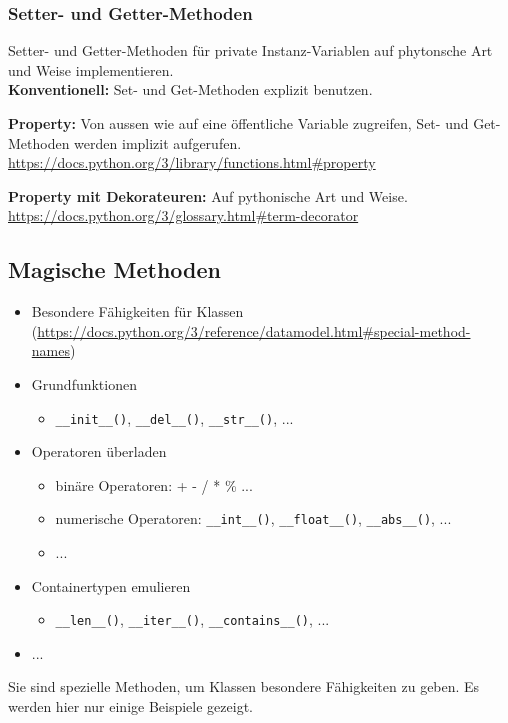 \subsubsection{Setter- und Getter-Methoden}
Setter- und Getter-Methoden für private Instanz-Variablen auf phytonsche Art und Weise implementieren.\\
\textbf{Konventionell:} Set- und Get-Methoden explizit benutzen.

\textbf{Property:} Von aussen wie auf eine öffentliche Variable zugreifen, Set- und Get-Methoden werden implizit aufgerufen.\\
\url{https://docs.python.org/3/library/functions.html#property}

\textbf{Property mit Dekorateuren:} Auf pythonische Art und Weise.\\
\url{https://docs.python.org/3/glossary.html#term-decorator}


\subsection{Magische Methoden}
\begin{itemize}
	\item Besondere Fähigkeiten für Klassen\\ (\url{https://docs.python.org/3/reference/datamodel.html#special-method-names})
	\item Grundfunktionen
	\begin{itemize}
		\item \texttt{\_\_init\_\_()}, \texttt{\_\_del\_\_()}, \texttt{\_\_str\_\_()}, ...
	\end{itemize}
	\item Operatoren überladen
	\begin{itemize}
		\item binäre Operatoren: + - / * \% ...
		\item numerische Operatoren: \texttt{\_\_int\_\_()}, \texttt{\_\_float\_\_()}, \texttt{\_\_abs\_\_()}, ...
		\item ...
	\end{itemize}
	\item Containertypen emulieren
	\begin{itemize}
		\item \texttt{\_\_len\_\_()}, \texttt{\_\_iter\_\_()}, \texttt{\_\_contains\_\_()}, ...
	\end{itemize}
	\item ...
\end{itemize}
Sie sind spezielle Methoden, um Klassen besondere Fähigkeiten zu geben. Es werden hier nur einige Beispiele gezeigt.

